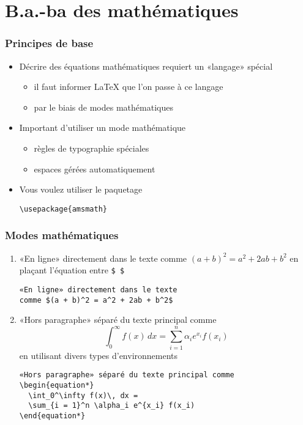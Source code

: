 
\section{B.a.-ba des mathématiques}

\begin{frame}[fragile=singleslide]
  \frametitle{Principes de base}
  \begin{itemize}
  \item Décrire des équations mathématiques requiert un «langage» spécial
    \begin{itemize}
    \item il faut informer {\LaTeX} que l'on passe à ce langage
    \item par le biais de modes mathématiques
    \end{itemize}
  \item Important d'utiliser un mode mathématique
    \begin{itemize}
    \item règles de typographie spéciales
    \item espaces gérées automatiquement
    \end{itemize}
  \item Vous voulez utiliser le paquetage 
\begin{lstlisting}
\usepackage{amsmath}
\end{lstlisting}
  \end{itemize}
\end{frame}

\begin{frame}[fragile]
  \frametitle{Modes mathématiques}
  \begin{enumerate}[<+->]
  \item «En ligne» directement dans le texte comme $(a + b)^2 = a^2 +
    2ab + b^2$ en plaçant l'équation entre \verb=$ $=
\begin{lstlisting}
«En ligne» directement dans le texte
comme $(a + b)^2 = a^2 + 2ab + b^2$
\end{lstlisting}
  \item «Hors paragraphe» séparé du texte principal comme
    \begin{equation*}
      \int_0^\infty f(x)\, dx = \sum_{i = 1}^n \alpha_i e^{x_i} f(x_i)
    \end{equation*}
    en utilisant divers types d'environnements
\begin{lstlisting}
«Hors paragraphe» séparé du texte principal comme
\begin{equation*}
  \int_0^\infty f(x)\, dx =
  \sum_{i = 1}^n \alpha_i e^{x_i} f(x_i)
\end{equation*}
\end{lstlisting}
  \end{enumerate}
\end{frame}

